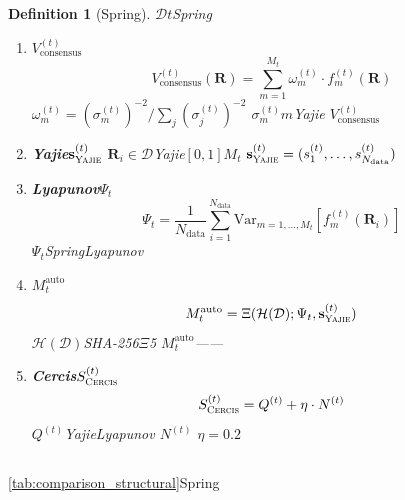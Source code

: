 \documentclass[12pt,a4paper]{article}
\newtheorem{definition}[theorem]{Definition}
\theoremstyle{remark}
\newcommand{\Var}{\mathrm{Var}}
\newcommand{\D}{\mathcal{D}}
\newcommand{\Yajie}{\textsc{Yajie}}
\newcommand{\Cercis}{\textsc{Cercis}}
\newcommand{\Mauto}{\ensuremath{M_t^{\text{auto}}}}
\newcommand{\Lyap}{\ensuremath{\Psi}}
\newcommand{\Dhash}{\ensuremath{\mathcal{H}(\D)}}
\begin{document}
\begin{definition}[Spring]
$\D$$t$Spring
\begin{enumerate}[label=(\arabic*),leftmargin=*,itemsep=4pt]
    \item \textbf{$V^{(t)}_{\text{consensus}}$}
    \begin{equation}
        V^{(t)}_{\text{consensus}}(\mathbf{R}) = \sum_{m=1}^{M_t} \omega_m^{(t)} \cdot f_m^{(t)}(\mathbf{R})
    \end{equation}
    $\omega_m^{(t)} = (\sigma_m^{(t)})^{-2} / \sum_{j} (\sigma_j^{(t)})^{-2}$
    $\sigma_m^{(t)}$$m$Yajie
    $V^{(t)}_{\text{consensus}}$\textit{}

    \item \textbf{Yajie$\mathbf{s}_{\Yajie}^{(t)}$}
    $\mathbf{R}_i \in \D$Yajie$[0,1]$$M_t$
    $\mathbf{s}_{\Yajie}^{(t)} = (s_1^{(t)}, \ldots, s_{N_{\text{data}}}^{(t)})$

    \item \textbf{Lyapunov$\Lyap_t$}
    \begin{equation}
        \Lyap_t = \frac{1}{N_{\text{data}}}\sum_{i=1}^{N_{\text{data}}} \Var_{m=1,\ldots,M_t}\left[f_m^{(t)}(\mathbf{R}_i)\right]
    \end{equation}
    $\Lyap_t$Spring\textit{}Lyapunov

    \item \textbf{$\Mauto$}
    \begin{equation}
        \Mauto = \Xi(\Dhash; \Lyap_t, \mathbf{s}_{\Yajie}^{(t)})
    \end{equation}
    $\Dhash$SHA-256$\Xi$5
    $\Mauto$——

    \item \textbf{Cercis$S_{\Cercis}^{(t)}$}
    \begin{equation}
        S_{\Cercis}^{(t)} = Q^{(t)} + \eta \cdot N^{(t)}
    \end{equation}
    $Q^{(t)}$YajieLyapunov
    $N^{(t)}$
    $\eta = 0.2$
\end{enumerate}
\end{definition}

\subsection{}

\ref{tab:comparison_structural}Spring\textbf{}
\end{document}
